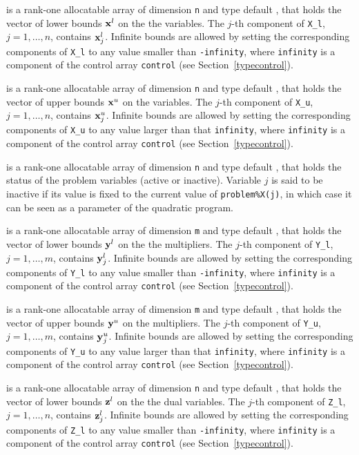 \documentclass{galahad}
\begin{document}
\begin{description}
 is a rank-one allocatable array of dimension {\tt n} and type 
default \realdp, that holds
the vector of lower bounds ${\mathbf{x}}^{l}$ on the the variables.
The $j$-th component of {\tt X\_l}, $j = 1, \ldots , n$, 
contains ${\mathbf{x}}_{j}^{l}$.
Infinite bounds are allowed by setting the corresponding 
components of {\tt X\_l} to any value smaller than {\tt -infinity}, 
where {\tt infinity} is a component of the control array {\tt control} 
(see Section~\ref{typecontrol}).

 is a rank-one allocatable array of dimension {\tt n} and type 
default \realdp, that holds
the vector of upper bounds ${\mathbf{x}}^{u}$ on the variables.
The $j$-th component of {\tt X\_u}, $j = 1, \ldots , n$, 
contains ${\mathbf{x}}_{j}^{u}$.
Infinite bounds are allowed by setting the corresponding 
components of {\tt X\_u} to any value larger than that {\tt infinity}, 
where {\tt infinity} is a component of the control array {\tt control} 
(see Section~\ref{typecontrol}).

 is a rank-one allocatable array of dimension {\tt n} and type 
default \integer, that holds the status of the problem variables (active or
inactive). Variable $j$ is said to be inactive if its value is fixed to the
current value of {\tt problem\%X(j)}, in which case it can be seen as a
parameter of the quadratic program.

 is a rank-one allocatable array of dimension {\tt m} and type 
default \realdp, that holds
the vector of lower bounds ${\mathbf{y}}^{l}$ on the the multipliers.
The $j$-th component of {\tt Y\_l}, $j = 1, \ldots , m$, 
contains ${\mathbf{y}}_{j}^{l}$.
Infinite bounds are allowed by setting the corresponding 
components of {\tt Y\_l} to any value smaller than {\tt -infinity}, 
where {\tt infinity} is a component of the control array {\tt control} 
(see Section~\ref{typecontrol}).

 is a rank-one allocatable array of dimension {\tt m} and type 
default \realdp, that holds
the vector of upper bounds ${\mathbf{y}}^{u}$ on the multipliers.
The $j$-th component of {\tt Y\_u}, $j = 1, \ldots , m$, 
contains ${\mathbf{y}}_{j}^{u}$.
Infinite bounds are allowed by setting the corresponding 
components of {\tt Y\_u} to any value larger than that {\tt infinity}, 
where {\tt infinity} is a component of the control array {\tt control} 
(see Section~\ref{typecontrol}).

 is a rank-one allocatable array of dimension {\tt n} and type 
default \realdp, that holds
the vector of lower bounds ${\mathbf{z}}^{l}$ on the the dual variables.
The $j$-th component of {\tt Z\_l}, $j = 1, \ldots , n$, 
contains ${\mathbf{z}}_{j}^{l}$.
Infinite bounds are allowed by setting the corresponding 
components of {\tt Z\_l} to any value smaller than {\tt -infinity}, 
where {\tt infinity} is a component of the control array {\tt control} 
(see Section~\ref{typecontrol}).


\end{description}
\end{document}
